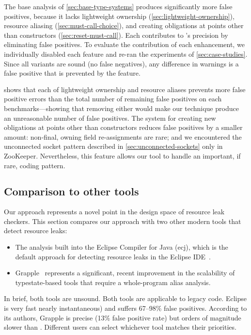 The base analysis of \cref{sec:base-type-systems} produces significantly
more false positives, because it lacks 
lightweight ownership (\cref{sec:lightweight-ownership}),
resource aliasing (\cref{sec:must-call-choice}), and
creating obligations at points other than constructors (\cref{sec:reset-must-call}).
Each contributes to \Tool's precision by eliminating false positives.
To evaluate the contribution of each enhancement, we individually disabled each
feature and re-ran the experiments of \cref{sec:case-studies}.
Since all variants are sound (no false
negatives), any difference in warnings is a false positive that is prevented
by the feature.

 shows that each of lightweight
ownership and resource aliases prevents more false positive errors than the total number
of remaining false positives on each benchmarks---showing that removing either
would make our technique produce an unreasonable number of false positives.
The system for creating new obligations at points other than constructors reduces
false positives by a smaller amount: non-final, owning field re-assignments are rare;
and we encountered the unconnected socket pattern described in \cref{sec:unconnected-sockets}
only in ZooKeeper. Nevertheless, this feature allows our tool to handle an important, if rare,
coding pattern.

\subsection{Comparison to other tools}
\label{sec:compare}

Our approach represents a novel point in the design space of resource leak checkers.
%
This section compares our approach with two other modern tools that detect resource leaks:
\begin{itemize}
\item The analysis built into the Eclipse Compiler for Java (ecj), which is the default approach
  for detecting resource leaks in the Eclipse IDE~\cite{ecj-resource-leak}.
\item Grapple~\cite{zuo2019grapple} represents a significant, recent
  improvement in the scalability of typestate-based tools that require a whole-program alias analysis.
\end{itemize}
In brief, both tools are unsound.
Both tools are applicable to legacy code. %
Eclipse is very fast nearly instantaneous) and suffers 67--98\% false
positives. %
According to its authors, Grapple is precise (13\% false positive rate) but orders
of magnitude slower than \Tool.
Different users can select whichever tool matches
their priorities.


